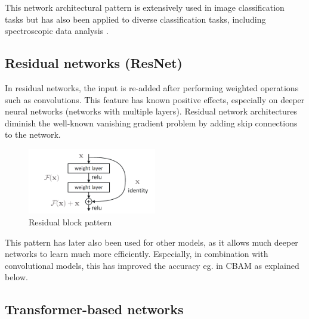 This network architectural pattern is extensively used in image classification tasks but has also been applied to diverse classification tasks, including spectroscopic data analysis \cite{sun_cnnlstm_2023, castorena_deep_2021, drera_deep_2019}.

\subsection{Residual networks (ResNet)}

In residual networks, the input is re-added after performing weighted operations such as convolutions. This feature has known positive effects, especially on deeper neural networks (networks with multiple layers). Residual network architectures diminish the well-known vanishing gradient problem by adding skip connections to the network. 

\begin{figure}[H]
    \centering
    \includegraphics[width=0.5\textwidth]{Figures/ResBlockVariants.png}
    \caption{Residual block pattern}
    \label{fig:res_block}
\end{figure}

This pattern has later also been used for other models, as it allows much deeper networks to learn much more efficiently. Especially, in combination with convolutional models, this has improved the accuracy eg. in CBAM as explained below.

    

\subsection{Transformer-based networks}

